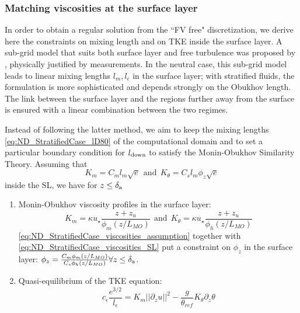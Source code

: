 \subsubsection{Matching viscosities at the surface layer}
\label{sec:ND_StratifiedCase_mixing_lengths_match}
In order to obtain a regular solution from the ``FV free"
discretization, we derive here the constraints on mixing length
and on TKE inside the surface layer.
A sub-grid model that suits both
surface layer and free turbulence was proposed by
\citep{redelsperger_simple_2001}, physically
justified by measurements.
In the neutral case, this sub-grid model leads to linear
mixing lengths $l_m, l_{\epsilon}$ in the surface layer;
with stratified fluids, the formulation is more sophisticated
and depends strongly on the Obukhov length.
The link between the surface layer and the regions
further away from the surface is ensured with a linear combination
between the two regimes.
%
\par
Instead of following the latter method,
we aim to keep the mixing lengths \eqref{eq:ND_StratifiedCase_lD80}
of the computational domain and
to set a particular boundary condition for $l_{\rm down}$
to satisfy the Monin-Obukhov Similarity Theory.
Assuming that 
\begin{equation}
	\label{eq:ND_StratifiedCase_viscosities_assumption}
K_m = C_m l_m \sqrt{e} ~~\text{and}~~
K_\theta = C_s l_m \phi_z \sqrt{e}
\end{equation}
inside the SL, we have
for $z\leq \delta_{\rm a}$
\begin{enumerate}
\item
Monin-Obukhov viscosity profiles in the surface layer:
\begin{equation}
	\label{eq:ND_StratifiedCase_viscosities_SL}
	K_m = \kappa u_\star\frac{z+ z_{u}}{\phi_m(z/L_{MO})} ~~\text{and}~~
K_\theta = \kappa u_\star\frac{z+ z_{u}}{\phi_h(z/L_{MO})}
\end{equation}
\eqref{eq:ND_StratifiedCase_viscosities_assumption}
together with \eqref{eq:ND_StratifiedCase_viscosities_SL} put
a constraint on $\phi_z$ in the surface layer:
$\phi_z = \frac{C_m\phi_m(z/L_{MO})}{C_s\phi_h(z/L_{MO})}
		\forall z\leq \delta_{\rm a}$.
\item Quasi-equilibrium of the TKE equation:
\begin{equation}
	\label{eq:ND_StratifiedCase_TKE_quasi_equilibrium}
	c_\epsilon \frac{e^{3/2}}{l_\epsilon}=K_m ||\partial_z u||^2 - \frac{g}{\theta_{ref}} K_\theta \partial_z \theta
\end{equation}
\end{enumerate}
